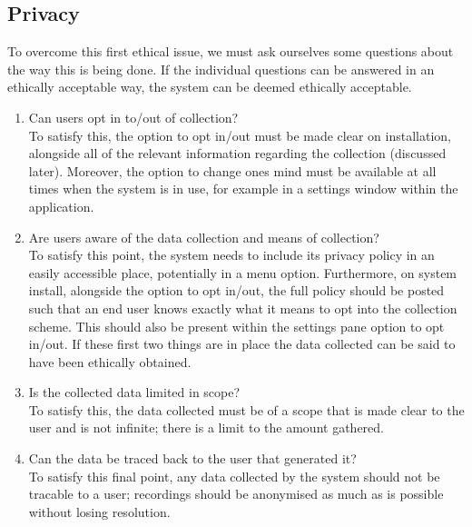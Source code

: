 \documentclass[12pt]{article}
\begin{document}
\subsection{Privacy}
To overcome this first ethical issue, we must ask ourselves some questions about the way this is being done. 
If the individual questions can be answered in an ethically acceptable way, the system can be deemed ethically acceptable. 
\begin{enumerate}
  \item Can users opt in to/out of collection?\\
        To satisfy this, the option to opt in/out must be made clear on installation, alongside all of the relevant information regarding the collection (discussed later). 
        Moreover, the option to change ones mind must be available at all times when the system is in use, for example in a settings window within the application. 
  \item Are users aware of the data collection and means of collection?\\
        To satisfy this point, the system needs to include its privacy policy in an easily accessible place, potentially in a menu option. 
        Furthermore, on system install, alongside the option to opt in/out, the full policy should be posted such that an end user knows exactly what it means to opt into the collection scheme. 
        This should also be present within the settings pane option to opt in/out. 
        If these first two things are in place the data collected can be said to have been ethically obtained. 
  \item Is the collected data limited in scope?\\
        To satisfy this, the data collected must be of a scope that is made clear to the user and is not infinite; there is a limit to the amount gathered. 
  \item Can the data be traced back to the user that generated it?\\
        To satisfy this final point, any data collected by the system should not be tracable to a user; recordings should be anonymised as much as is possible without losing resolution. 
\end{enumerate}
\end{document}
